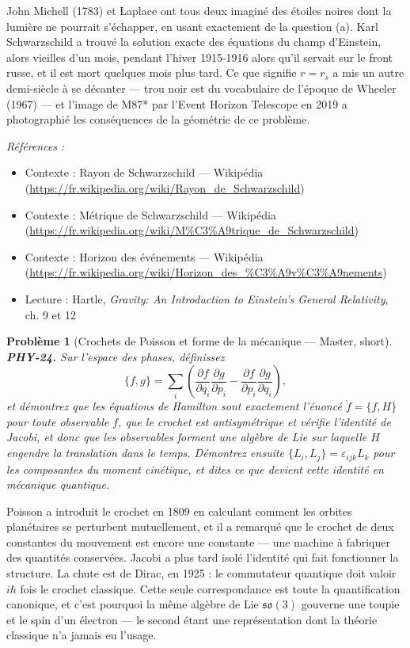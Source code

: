 \documentclass[11pt]{article}
\newtheorem{problem}{Problème}
\newenvironment{refs}{\par\small\noindent\emph{Références :}\begin{itemize}\setlength\itemsep{0pt}}{\end{itemize}\normalsize}
\begin{document}
\noindent John Michell (1783) et Laplace ont tous deux imaginé des \og{} étoiles noires \fg{}
dont la lumière ne pourrait s'échapper, en usant exactement de la question (a). Karl Schwarzschild
a trouvé la solution exacte des équations du champ d'Einstein, alors vieilles d'un mois, pendant
l'hiver 1915-1916 alors qu'il servait sur le front russe, et il est mort quelques mois plus tard.
Ce que signifie $r = r_s$ a mis un autre demi-siècle à se décanter --- \og{} trou noir \fg{} est du
vocabulaire de l'époque de Wheeler (1967) --- et l'image de M87* par l'Event Horizon Telescope en
2019 a photographié les conséquences de la géométrie de ce problème.

\begin{refs}
\item Contexte : Rayon de Schwarzschild --- Wikipédia (\url{https://fr.wikipedia.org/wiki/Rayon_de_Schwarzschild})
\item Contexte : Métrique de Schwarzschild --- Wikipédia (\url{https://fr.wikipedia.org/wiki/M%C3%A9trique_de_Schwarzschild})
\item Contexte : Horizon des événements --- Wikipédia (\url{https://fr.wikipedia.org/wiki/Horizon_des_%C3%A9v%C3%A9nements})
\item Lecture : Hartle, \textit{Gravity: An Introduction to Einstein's General Relativity}, ch. 9 et 12
\end{refs}

\bigskip

\begin{problem}[{Crochets de Poisson et forme de la mécanique --- Master, short}]
\textbf{PHY-24.} Sur l'espace des phases, définissez
\[ \{f,g\} = \sum_i \left( \frac{\partial f}{\partial q_i}\frac{\partial g}{\partial p_i}
- \frac{\partial f}{\partial p_i}\frac{\partial g}{\partial q_i} \right), \]
et démontrez que les équations de Hamilton sont exactement l'énoncé $\dot{f} = \{f, H\}$ pour
toute observable $f$, que le crochet est antisymétrique et vérifie l'identité de Jacobi, et
donc que les observables forment une algèbre de Lie sur laquelle $H$ engendre la translation
dans le temps. Démontrez ensuite $\{L_i, L_j\} = \varepsilon_{ijk} L_k$ pour les composantes du
moment cinétique, et dites ce que devient cette identité en mécanique quantique.
\end{problem}

\noindent Poisson a introduit le crochet en 1809 en calculant comment les orbites
planétaires se perturbent mutuellement, et il a remarqué que le crochet de deux constantes du
mouvement est encore une constante --- une machine à fabriquer des quantités conservées. Jacobi a
plus tard isolé l'identité qui fait fonctionner la structure. La chute est de Dirac, en 1925 : le
commutateur quantique doit valoir $i\hbar$ fois le crochet classique. Cette seule correspondance
est toute la quantification canonique, et c'est pourquoi la même algèbre de Lie
$\mathfrak{so}(3)$ gouverne une toupie et le spin d'un électron --- le second étant une
représentation dont la théorie classique n'a jamais eu l'usage.
\end{document}

